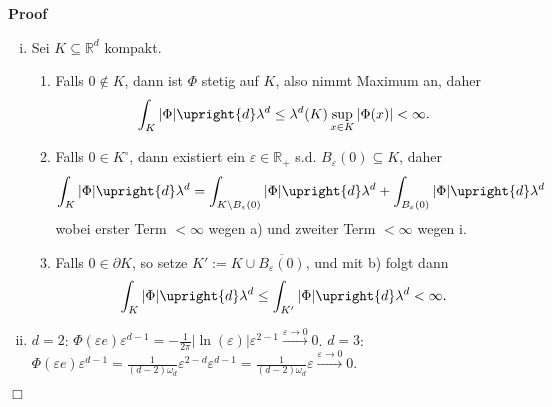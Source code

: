 \documentclass{book}
\newcommand{\assign}{:=}
\newenvironment{enumeratealpha}{\begin{enumerate}[a{\textup{)}}] }{\end{enumerate}}
\newenvironment{enumerateroman}{\begin{enumerate}[i.] }{\end{enumerate}}
\newenvironment{proof}{\noindent\textbf{Proof\ }}{\hspace*{\fill}$\Box$\medskip}
\begin{document}
\begin{proof}
\begin{enumerateroman}
    \item Sei $K \subseteq \mathbb{R}^d$ kompakt.
    \begin{enumeratealpha}
      \item Falls $0 \notin K$, dann ist $\Phi$ stetig auf $K$, also nimmt
      Maximum an, daher
      \[ \int_K | \Phi | \upright{d} \lambda^d \leq \lambda^d (K) \sup_{x \in
         K} | \Phi (x) | < \infty . \]
      \item Falls $0 \in K^{\circ}$, dann existiert ein $\varepsilon \in
      \mathbb{R}_+$ s.d. $B_{\varepsilon} (0) \subseteq K$, daher
      \[ \int_K | \Phi | \upright{d} \lambda^d = \int_{K \backslash
         B_{\varepsilon} (0)} | \Phi | \upright{d} \lambda^d +
         \int_{B_{\varepsilon} (0)} | \Phi | \upright{d} \lambda^d \]
      wobei erster Term $< \infty$ wegen a) und zweiter Term $< \infty$ wegen
      i.
      
      \item Falls $0 \in \partial K$, so setze $K' \assign K \cup
      \overline{B_{\varepsilon} (0)}$, und mit b) folgt dann \
      \[ \int_K | \Phi | \upright{d} \lambda^d \leq \int_{K'} | \Phi |
         \upright{d} \lambda^d < \infty . \]
    \end{enumeratealpha}
    \item $d = 2$: $\Phi (\varepsilon e) \varepsilon^{d - 1} = - \frac{1}{2
    \pi} | \ln (\varepsilon) | \varepsilon^{2 - 1} \xrightarrow{\varepsilon
    \rightarrow 0} 0$.{\hspace{16em}} $d = 3$: $\Phi (\varepsilon e)
    \varepsilon^{d - 1} = \frac{1}{(d - 2) \omega_d} \varepsilon^{2 - d}
    \varepsilon^{d - 1} = \frac{1}{(d - 2) \omega_d} \varepsilon
    \xrightarrow{\varepsilon \rightarrow 0} 0$.
    

\end{enumerateroman}
\end{proof}
\end{document}
